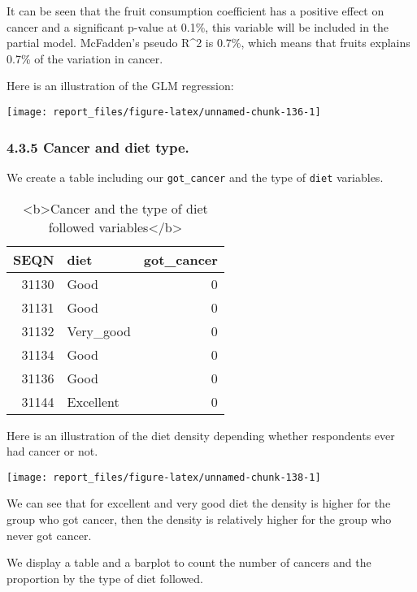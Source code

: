 \documentclass[
]{article}
\begin{document}
It can be seen that the fruit consumption coefficient has a positive
effect on cancer and a significant p-value at 0.1\%, this variable will
be included in the partial model. McFadden's pseudo R\^{}2 is 0.7\%,
which means that fruits explains 0.7\% of the variation in cancer.

Here is an illustration of the GLM regression:

\begin{center}\texttt{[image: report\_files/figure-latex/unnamed-chunk-136-1]} \end{center}

\hypertarget{cancer-and-diet-type.}{%
\subsubsection{4.3.5 Cancer and diet
type.}\label{cancer-and-diet-type.}}

We create a table including our \texttt{got\_cancer} and the type of
\texttt{diet} variables.

\begin{table}

\caption{\label{tab:unnamed-chunk-137}<b>Cancer and the type of diet followed variables</b>}
\centering
\begin{tabular}[t]{r|l|r}
\hline
SEQN & diet & got\_cancer\\
\hline
31130 & Good & 0\\
\hline
31131 & Good & 0\\
\hline
31132 & Very\_good & 0\\
\hline
31134 & Good & 0\\
\hline
31136 & Good & 0\\
\hline
31144 & Excellent & 0\\
\hline
\end{tabular}
\end{table}

Here is an illustration of the diet density depending whether
respondents ever had cancer or not.

\begin{center}\texttt{[image: report\_files/figure-latex/unnamed-chunk-138-1]} \end{center}

We can see that for excellent and very good diet the density is higher
for the group who got cancer, then the density is relatively higher for
the group who never got cancer.

We display a table and a barplot to count the number of cancers and the
proportion by the type of diet followed.
\end{document}
